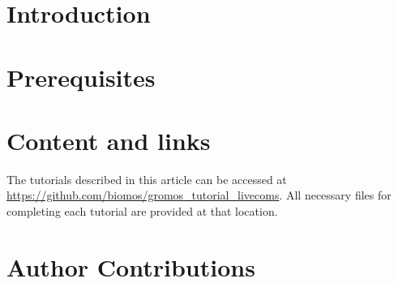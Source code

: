 \documentclass[9pt,tutorial,pubversion]{../includes/livecoms}
\newcommand{\githubrepository}{\url{https://github.com/biomos/gromos_tutorial_livecoms}}  %
\begin{document}
\section{Introduction}




\section{Prerequisites}




\section{Content and links}

The tutorials described in this article can be accessed at \githubrepository. All necessary files for completing each tutorial are provided at that location.

%














\section{Author Contributions}
%
\end{document}
